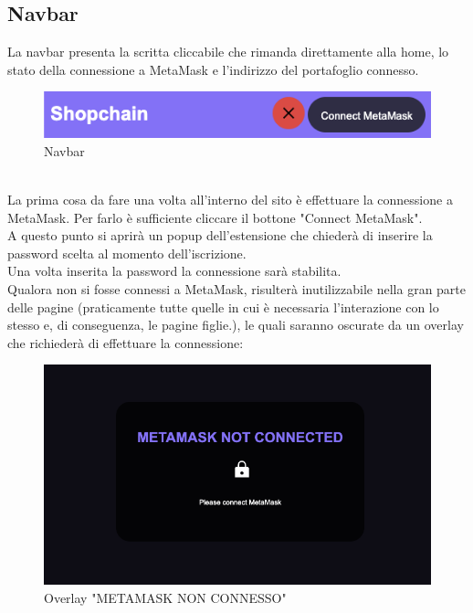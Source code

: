     \subsection{Navbar} \label{subsection:Navbar}
    La navbar presenta la scritta \projectName{} cliccabile che rimanda direttamente alla home, lo stato della connessione a MetaMask e l'indirizzo del portafoglio connesso.
    \begin{figure}[H]
        \centering
        \includegraphics[scale=0.5]{immagini/navbar.png}
        \caption{Navbar}
    \end{figure}
    \textbf{}\\
    La prima cosa da fare una volta all'interno del sito è effettuare la connessione a MetaMask. Per farlo è sufficiente cliccare il bottone "Connect MetaMask".\\
    A questo punto si aprirà un popup dell'estensione che chiederà di inserire la password scelta al momento dell'iscrizione.\\
    Una volta inserita la password la connessione sarà stabilita.\\
    Qualora non si fosse connessi a MetaMask, \projectName{} risulterà inutilizzabile nella gran parte delle pagine (praticamente tutte quelle in cui è necessaria l'interazione con lo stesso e, di conseguenza, le pagine figlie.), le quali saranno oscurate da un overlay che richiederà di effettuare la connessione:
    \begin{figure}[H]
        \centering
        \includegraphics[scale=0.4]{immagini/MetaMaskLayer.png}
        \caption{Overlay "METAMASK NON CONNESSO"}
    \end{figure}
